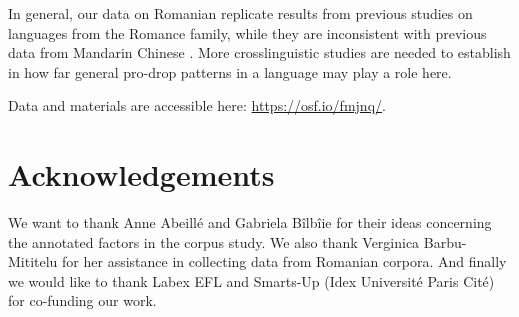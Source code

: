 \documentclass[output=paper,colorlinks,citecolor=brown]{langscibook}
\begin{document}
In general, our data on Romanian replicate results from previous studies \citep{costa2004semantic, mayol2018asymmetries, contemori2021microvariation} on  languages from the Romance family, while they are inconsistent with previous data from Mandarin Chinese \citep{hwang2022role}. More crosslinguistic studies are needed to establish in how far general pro-drop patterns in a language may play a role here.

Data and materials are accessible here:
\href{https://osf.io/fmjnq/}{https://osf.io/fmjnq/}.

\section*{Acknowledgements}

We want to thank Anne Abeillé and Gabriela Bîlbîie for their ideas concerning the annotated factors in the corpus study. We also thank Verginica Barbu-Mititelu for her assistance in collecting data from Romanian corpora. And finally we would like to thank Labex EFL and Smarts-Up (Idex Université Paris Cité) for co-funding our work.


\sloppy
\printbibliography[heading=subbibliography,notkeyword=this]
\end{document}
